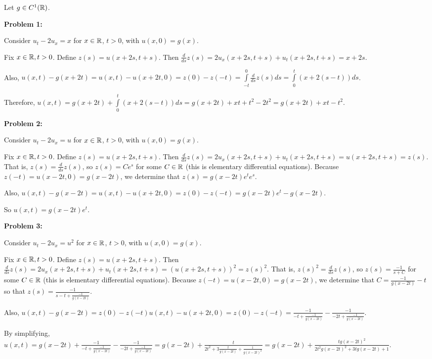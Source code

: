 \documentclass[a4paper,12pt]{article}
\begin{document}
Let $g \in C^1(\mathbb{R})$. 

{\bf Problem 1:} %

Consider $u_t -2u_x = x$ for $x \in \mathbb{R}$, $t >0$, with $u(x,0) = g(x)$.

Fix $x \in \mathbb{R}, t >0$. Define $z(s) = u(x+2s,t+s)$. Then $\frac{d}{ds}z(s) = 2u_x(x+2s,t+s) + u_t(x+2s,t+s) = x+2s$.

Also, $u(x,t) - g(x+2t) = u(x,t) - u(x+2t,0) = z(0) - z(-t) = \int\limits_{-t}^0 \frac{d}{ds}z(s) ds = \int\limits_0^t (x+2(s-t))ds$. %

Therefore, $u(x,t) = g(x+2t) + \int\limits_0^t (x+2(s-t))ds = g(x+2t) + xt + t^2 -2t^2 =g(x+2t) + xt - t^2$.

\shunt

{\bf Problem 2:}

Consider $u_t -2u_x = u$ for $x \in \mathbb{R}$, $t >0$, with $u(x,0) = g(x)$.

Fix $x \in \mathbb{R}, t >0$. Define $z(s) = u(x+2s,t+s)$. Then $\frac{d}{ds}z(s) = 2u_x(x+2s,t+s) + u_t(x+2s,t+s) = u(x+2s,t+s)=z(s)$. That is, $z(s) = \frac{d}{ds}z(s)$, so $z(s) = Ce^s$ for some $C \in \mathbb{R}$ (this is elementary differential equations). Because $z(-t) = u(x-2t,0)=g(x-2t)$, we determine that $z(s) = g(x-2t)e^te^s$. 

Also, $u(x,t) - g(x-2t)  = u(x,t) - u(x+2t,0) = z(0) - z(-t) = g(x-2t)e^t -g(x-2t)$.

So $u(x,t) = g(x-2t)e^t$.

\shunt

{\bf Problem 3:}

Consider $u_t -2u_x = u^2$ for $x \in \mathbb{R}$, $t >0$, with $u(x,0) = g(x)$.

Fix $x \in \mathbb{R}, t >0$. Define $z(s) = u(x+2s,t+s)$. Then $\frac{d}{ds}z(s) = 2u_x(x+2s,t+s) + u_t(x+2s,t+s) = (u(x+2s,t+s))^2=z(s)^2$. That is, $z(s)^2 = \frac{d}{ds}z(s)$, so $z(s) = \frac{-1}{s+C}$ for some $C \in \mathbb{R}$ (this is elementary differential equations). Because $z(-t) = u(x-2t,0)=g(x-2t)$, we determine that $C= \frac{-1}{g(x-2t)} -t$ so that $z(s) = \frac{-1}{s-t+\frac{-1}{g(x-2t)}}$.

Also, $u(x,t) - g(x-2t) = z(0) - z(-t)u(x,t) - u(x+2t,0) = z(0) - z(-t) =\frac{-1}{-t+\frac{-1}{g(x-2t)}} - \frac{-1}{-2t+\frac{-1}{g(x-2t)}}$.

By simplifying, $u(x,t) = g(x-2t) + \frac{-1}{-t+\frac{-1}{g(x-2t)}} - \frac{-1}{-2t+\frac{-1}{g(x-2t)}}=g(x-2t) + \frac{t}{2t^2 + 3\frac{t}{g(x-2t)} + \frac{1}{g(x-2t)^2}} = g(x-2t) + \frac{tg(x-2t)^2}{2t^2g(x-2t)^2 +3tg(x-2t) +1}$. 

\shunt
\end{document}
